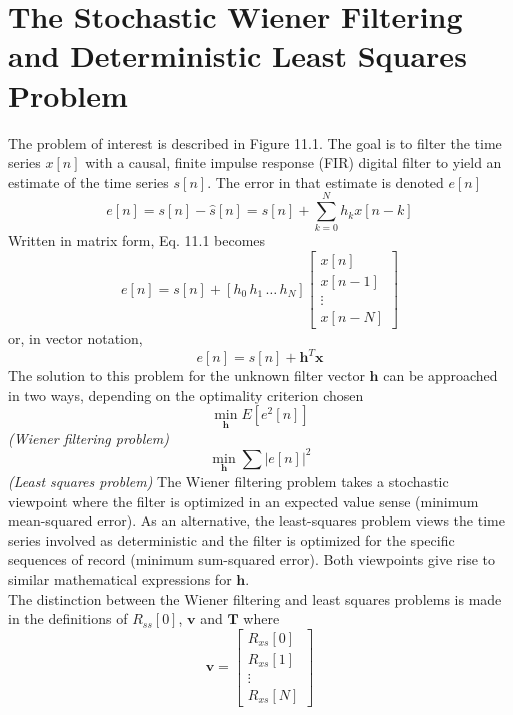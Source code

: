 \documentclass[11pt]{book}
\theoremstyle{example}
\begin{document}
\section{The Stochastic Wiener Filtering and Deterministic Least Squares Problem}
The problem of interest is described in Figure 11.1. The goal is to filter the time series $x[n]$ with a causal, finite impulse response (FIR) digital filter to yield an estimate of the time series $s[n]$. The error in that estimate is denoted $e[n]$
\begin{equation}
	e[n]=s[n]-\hat{s}[n]=s[n]+\sum_{k=0}^N{h_kx[n-k]}
\end{equation}
Written in matrix form, Eq. 11.1 becomes
\begin{equation}
	e[n]=s[n]+[h_0\,h_1\,\dots\,h_N]
	\begin{bmatrix}
		x[n]\\
		x[n-1]\\
		\vdots\\
		x[n-N]
	\end{bmatrix}
\end{equation}
or, in vector notation,
\begin{equation}
	e[n]=s[n]+\mathbf{h}^T\mathbf{x}
\end{equation}
The solution to this problem for the unknown filter vector $\mathbf{h}$ can be approached in two ways, depending on the optimality criterion chosen
\begin{equation}
	\min_{\mathbf{h}}E\left[e^2[n]\right]
\end{equation}
\emph{(Wiener filtering problem)}
\begin{equation}
	\min_{\mathbf{h}}\sum{|e[n]|^2}
\end{equation}
\emph{(Least squares problem)}
The Wiener filtering problem takes a stochastic viewpoint where the filter is optimized in an expected value sense (minimum mean-squared error). As an alternative, the least-squares problem views the time series involved as deterministic and the filter is optimized for the specific sequences of record (minimum sum-squared error). Both viewpoints give rise to similar mathematical expressions for $\mathbf{h}$.\\
The distinction between the Wiener filtering and least squares problems is made in the definitions of $R_{ss}[0]$, $\mathbf{v}$ and $\mathbf{T}$ where
\begin{equation}
	\mathbf{v}=
	\begin{bmatrix}
		R_{xs}[0]\\
		R_{xs}[1]\\
		\vdots\\
		R_{xs}[N]
	\end{bmatrix}
\end{equation}
\end{document}
